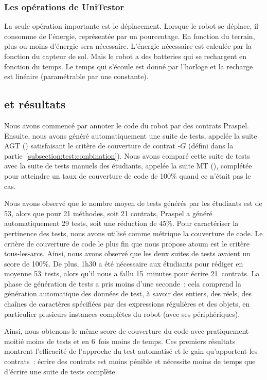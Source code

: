\subsubsection{Les opérations de UniTestor}

La seule opération importante est le déplacement. Lorsque le robot se déplace,
il consomme de l'énergie, représentée par un pourcentage. En fonction du
terrain, plus ou moins d'énergie sera nécessaire. L'énergie nécessaire est
calculée par la fonction  du capteur de sol. Mais le robot
a des batteries qui se rechargent en fonction du temps. Le temps qui s'écoule
est donné par l'horloge et la recharge est linéaire (paramétrable par une
constante).

\subsection{ et résultats}

Nous avons commencé par annoter le code du robot par des contrats Praspel.
Ensuite, nous avons généré automatiquement une suite de tests, appelée la suite
AGT () satisfaisant le critère de
couverture de contrat -$G$ (défini dans la
partie~\ref{subsection:test:combination}). Nous avons comparé cette suite de
tests avec la suite de tests manuels des étudiants, appelée la suite MT
(), complétée pour atteindre un taux de couverture de
code de 100\% quand ce n'était pas le cas.

Nous avons observé que le nombre moyen de tests générés par les étudiants est de
53, alors que pour 21 méthodes, soit 21 contrats, Praspel a généré
automatiquement 29 tests, soit une réduction de 45\%. Pour caractériser la
pertinence des tests, nous avons utilisé comme métrique la couverture de code.
Le critère de couverture de code le plus fin que nous propose atoum est le
critère tous-les-arcs. Ainsi, nous avons observé que les deux suites de tests
avaient un score de 100\%. De plus, 1h30 a été nécessaire aux étudiants pour
rédiger en moyenne 53~tests, alors qu'il nous a fallu 15~minutes pour écrire
21~contrats.  La phase de génération de tests a pris moins d'une seconde~: cela
comprend la génération automatique des données de test, à savoir des entiers,
des réels, des chaînes de caractères spécifiées par des expressions régulières
et des objets, en particulier plusieurs instances complètes du robot (avec ses
périphériques).

Ainsi, nous obtenons le même score de couverture du code avec pratiquement
moitié moins de tests et en 6~fois moins de temps. Ces premiers résultats
montrent l'efficacité de l'approche du test automatisé et le gain qu'apportent
les contrats~: écrire des contrats est moins pénible et nécessite moins de temps
que d'écrire une suite de tests complète.

